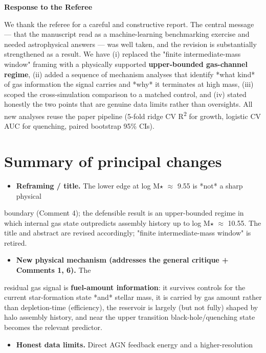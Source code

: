 \documentclass[11pt]{article}
\begin{document}
\begin{center}{\Large\bfseries Response to the Referee}\end{center}\medskip
We thank the referee for a careful and constructive report. The central message --- that the manuscript read as a machine-learning benchmarking exercise and needed astrophysical answers --- was well taken, and the revision is substantially strengthened as a result. We have (i) replaced the "finite intermediate-mass window" framing with a physically supported \textbf{upper-bounded gas-channel regime}, (ii) added a sequence of mechanism analyses that identify *what kind* of gas information the signal carries and *why* it terminates at high mass, (iii) scoped the cross-simulation comparison to a matched control, and (iv) stated honestly the two points that are genuine data limits rather than oversights. All new analyses reuse the paper pipeline (5-fold ridge CV R\textsuperscript{2} for growth, logistic CV AUC for quenching, paired bootstrap 95\% CIs).

\section*{Summary of principal changes}
\begin{itemize}
\item \textbf{Reframing / title.} The lower edge at log M$\star$ $\approx$ 9.55 is *not* a sharp physical
\end{itemize}

boundary (Comment 4); the defensible result is an upper-bounded regime in which internal gas state outpredicts assembly history up to log M$\star$ $\approx$ 10.55. The title and abstract are revised accordingly; "finite intermediate-mass window" is retired.

\begin{itemize}
\item \textbf{New physical mechanism (addresses the general critique + Comments 1, 6).} The
\end{itemize}

residual gas signal is \textbf{fuel-amount information}: it survives controls for the current star-formation state *and* stellar mass, it is carried by gas amount rather than depletion-time (efficiency), the reservoir is largely (but not fully) shaped by halo assembly history, and near the upper transition black-hole/quenching state becomes the relevant predictor.

\begin{itemize}
\item \textbf{Honest data limits.} Direct AGN feedback energy and a higher-resolution
\end{itemize}
\end{document}
